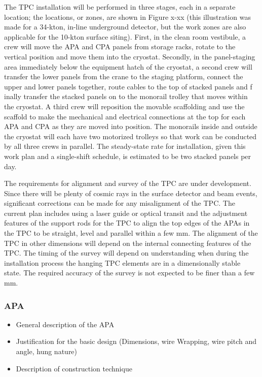   The TPC installation will be performed in three stages, each in a separate location; the locations, or 
  zones, are shown in Figure x-xx (this illustration was made for a 34-kton, in-line underground 
  detector, but the work zones are also applicable for the 10-kton surface siting). First, in the clean room 
  vestibule, a crew will move the APA and CPA panels from storage racks, rotate to the vertical position 
  and move them into the cryostat. Secondly, in the panel-staging area immediately below the equipment 
  hatch of the cryostat, a second crew will transfer the lower panels from the crane to the staging 
  platform, connect the upper and lower panels together, route cables to the top of stacked panels and f
  inally transfer the stacked panels on to the monorail trolley that moves within the cryostat. A third crew 
  will reposition the movable scaffolding and use the scaffold to make the mechanical and electrical 
  connections at the top for each APA and CPA as they are moved into position. The monorails inside and 
  outside the cryostat will each have two motorized trolleys so that work can be conducted by all three 
  crews in parallel. The steady-state rate for installation, given this work plan and a single-shift schedule, 
  is estimated to be two stacked panels per day.  

The requirements for alignment and survey of the TPC are under development. Since there will be plenty 
of cosmic rays in the surface detector and beam events, significant corrections can be made for any 
misalignment of the TPC. The current plan includes using a laser guide or optical transit and the 
adjustment features of the support rods for the TPC to align the top edges of the APAs in the TPC to be 
straight, level and parallel within a few mm. The alignment of the TPC in other dimensions will depend on 
the internal connecting features of the TPC.  The timing of the survey will depend on understanding when 
during the installation process the hanging TPC elements are in a dimensionally stable state. The 
required accuracy of the survey is not expected to be finer than a few mm.  

\subsubsection{APA}
\begin{itemize}
\item General description of the APA
\item Justification for the basic design (Dimensions, wire Wrapping, wire pitch and angle, hung nature)
\item Description of construction technique
\end{itemize}

